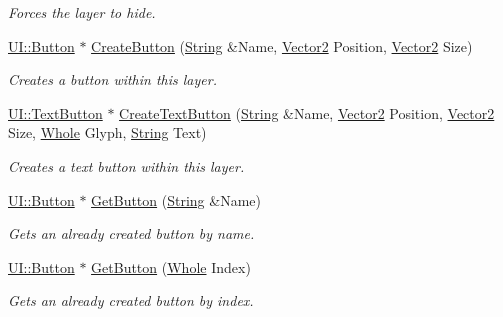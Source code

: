 \begin{DoxyCompactItemize}
\begin{DoxyCompactList}\small\item\em Forces the layer to hide. \item\end{DoxyCompactList}\item 
\hyperlink{classphys_1_1UI_1_1Button}{UI::Button} $\ast$ \hyperlink{classphys_1_1UILayer_ae9f610485bcd45f2ef48813f06304182}{CreateButton} (\hyperlink{namespacephys_aa03900411993de7fbfec4789bc1d392e}{String} \&Name, \hyperlink{classphys_1_1Vector2}{Vector2} Position, \hyperlink{classphys_1_1Vector2}{Vector2} Size)
\begin{DoxyCompactList}\small\item\em Creates a button within this layer. \item\end{DoxyCompactList}\item 
\hyperlink{classphys_1_1UI_1_1TextButton}{UI::TextButton} $\ast$ \hyperlink{classphys_1_1UILayer_a000fdc8f6aa413798f368409125cbd34}{CreateTextButton} (\hyperlink{namespacephys_aa03900411993de7fbfec4789bc1d392e}{String} \&Name, \hyperlink{classphys_1_1Vector2}{Vector2} Position, \hyperlink{classphys_1_1Vector2}{Vector2} Size, \hyperlink{namespacephys_a460f6bc24c8dd347b05e0366ae34f34a}{Whole} Glyph, \hyperlink{namespacephys_aa03900411993de7fbfec4789bc1d392e}{String} Text)
\begin{DoxyCompactList}\small\item\em Creates a text button within this layer. \item\end{DoxyCompactList}\item 
\hyperlink{classphys_1_1UI_1_1Button}{UI::Button} $\ast$ \hyperlink{classphys_1_1UILayer_a2d6e9b80e09b8287b72faffeb13e6d43}{GetButton} (\hyperlink{namespacephys_aa03900411993de7fbfec4789bc1d392e}{String} \&Name)
\begin{DoxyCompactList}\small\item\em Gets an already created button by name. \item\end{DoxyCompactList}\item 
\hyperlink{classphys_1_1UI_1_1Button}{UI::Button} $\ast$ \hyperlink{classphys_1_1UILayer_a98acc74c401ba1b28c53f1ea8966b950}{GetButton} (\hyperlink{namespacephys_a460f6bc24c8dd347b05e0366ae34f34a}{Whole} Index)
\begin{DoxyCompactList}\small\item\em Gets an already created button by index. \item\end{DoxyCompactList}\item 

\end{DoxyCompactItemize}
